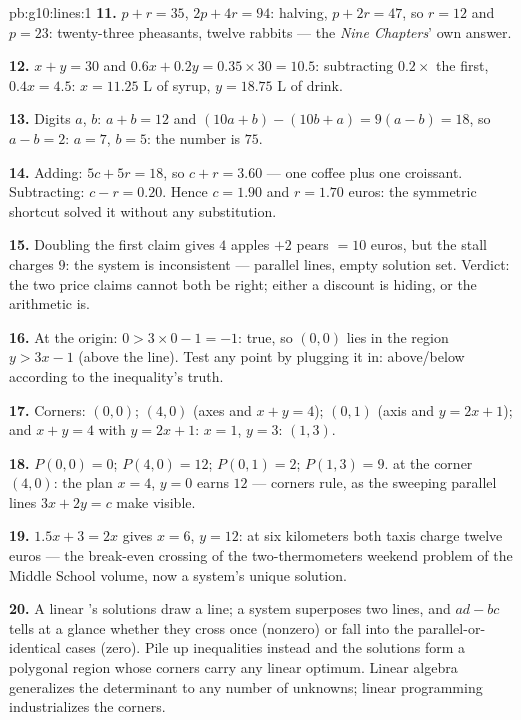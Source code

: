 \begin{solution}{pb:g10:lines:1}
\textbf{11.} $p + r = 35$, $2p + 4r = 94$: halving,
$p + 2r = 47$, so $r = 12$ and $p = 23$: twenty-three pheasants,
twelve rabbits --- the \emph{Nine Chapters}' own answer.

\textbf{12.} $x + y = 30$ and $0.6x + 0.2y = 0.35 \times 30 =
10.5$: subtracting $0.2 \times$ the first, $0.4x = 4.5$:
$x = 11.25$ L of syrup, $y = 18.75$ L of drink.

\textbf{13.} Digits $a$, $b$: $a + b = 12$ and
$(10a + b) - (10b + a) = 9(a - b) = 18$, so $a - b = 2$:
$a = 7$, $b = 5$: the number is $75$.

\textbf{14.} Adding: $5c + 5r = 18$, so $c + r = 3.60$ --- one
coffee plus one croissant. Subtracting: $c - r = 0.20$. Hence
$c = 1.90$ and $r = 1.70$ euros: the symmetric shortcut solved
it without any substitution.

\textbf{15.} Doubling the first claim gives $4$ apples $+ 2$
pears $= 10$ euros, but the stall charges $9$: the system is
inconsistent --- parallel lines, empty solution set. Verdict:
the two price claims cannot both be right; either a discount
is hiding, or the arithmetic is.

\textbf{16.} At the origin: $0 > 3 \times 0 - 1 = -1$: true,
so $(0,0)$ lies in the region $y > 3x - 1$ (above the line).
Test any point by plugging it in: above/below according to the
inequality's truth.

\textbf{17.} Corners: $(0, 0)$; $(4, 0)$ (axes and
$x + y = 4$); $(0, 1)$ (axis and $y = 2x + 1$); and
$x + y = 4$ with $y = 2x + 1$: $x = 1$, $y = 3$: $(1, 3)$.

\textbf{18.} $P(0,0) = 0$; $P(4, 0) = 12$; $P(0, 1) = 2$;
$P(1, 3) = 9$.  at the corner $(4, 0)$: the plan
$x = 4$, $y = 0$ earns $12$ --- corners rule, as the sweeping
parallel lines $3x + 2y = c$ make visible.

\textbf{19.} $1.5x + 3 = 2x$ gives $x = 6$, $y = 12$: at six
kilometers both taxis charge twelve euros --- the break-even
crossing of the two-thermometers weekend problem of the Middle School volume, now a system's unique
solution.

\textbf{20.} A linear 's solutions draw a line; a
system superposes two lines, and $ad - bc$ tells at a glance
whether they cross once (nonzero) or fall into the
parallel-or-identical cases (zero). Pile up inequalities
instead and the solutions form a polygonal region whose corners
carry any linear optimum. Linear algebra generalizes the
determinant to any number of unknowns; linear programming
industrializes the corners.
\end{solution}
